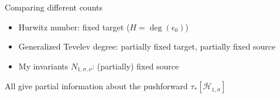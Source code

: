 \documentclass{beamer}
\theoremstyle{definition}
\begin{document}
\begin{frame}{Comparing different counts}
\begin{itemize}
                                                                                                                                                                                                                              \item Hurwitz number: fixed {\color{red}target} ($H=\deg(\epsilon_0)$)
                                                                                                                                                                                                                              \item Generalized Tevelev degree: partially fixed {\color{red}target}, partially fixed {\color{green!70!black}source}
                                                                                                                                                                                                                                \item My invariants $N_{1,\sigma,\nu}$: (partially) fixed {\color{green!70!black}source}
  
                                                                                                                                                                                                                            \end{itemize}
                                                                                                                                                                                                                            All give partial information about the pushforward $\tau_*[\overline{\mathcal H}_{1,\sigma}]$
                                                                                                                                                                                                                          \end{frame}

\end{document}
